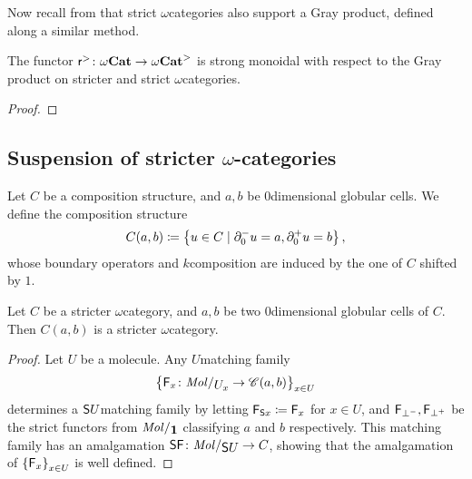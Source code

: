 

Now recall from \cite[Appendice A]{ara2020joint} that strict \( \omega \)\nbd categories also support a Gray product, defined along a similar method.

\begin{prop} \label{prop:reflection_to_stricter_monoidal}
    The functor \( \mathsf{r}^{>} \colon {\omega\mathbf{Cat}} \to {\omega\mathbf{Cat}}^> \) is strong monoidal with respect to the Gray product on stricter and strict \( \omega \)\nbd categories.
\end{prop}
\begin{proof}
\end{proof}

\subsection{Suspension of stricter \texorpdfstring{$\omega$}{}-categories}

\begin{dfn} 
    Let \( C \) be a composition structure, and \( a, b \) be \( 0 \)\nbd dimensional globular cells.
    We define the composition structure
    \begin{equation*}
        C(a, b) \coloneqq \left\{ {u \in C \mid \partial_{0}^{-} u = a, \partial_{0}^{+} u = b} \right\},    
    \end{equation*}
    whose boundary operators and \( k \)\nbd composition are induced by the one of \( C \) shifted by \( 1 \).
\end{dfn}

\begin{lem} \label{lem:hom_of_stricter_is_stricter}
    Let \( C \) be a stricter \( \omega \)\nbd category, and \( a, b \) be two \( 0 \)\nbd dimensional globular cells of \( C \).
    Then \( C(a, b) \) is a stricter \( \omega \)\nbd category.
\end{lem}
\begin{proof}
    Let \( U \) be a molecule.
    Any \( U \)\nbd matching family 
    \begin{equation*}
        \set{\F_x \colon \molecin{\imel{U}{x}} \to \C(a, b)}_{x \in U}
    \end{equation*}
    determines a \( \mathsf{S}{U} \)\nbd matching family 
    by letting \( \mathsf{F}_{\mathsf{S}{x}} \coloneqq \mathsf{F}_x \) for \( x \in U \), and \( \mathsf{F}_{\bot^-}, \mathsf{F}_{\bot^+} \) be the strict functors from \( \molecin{\pt} \) classifying \( a \) and \( b \) respectively. 
    This matching family has an amalgamation \( \sus{\F} \colon \molecin{\sus{U}} \to C \), showing that the amalgamation of \( \left\{ {\mathsf{F}_x} \right\}_{x \in U} \) is well defined.
\end{proof}

